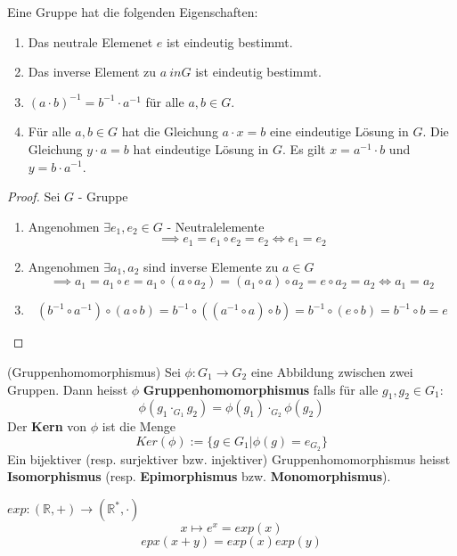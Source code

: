 \documentclass[../Algebra_script.tex]{subfiles}
\begin{document}
\begin{proposition}
	Eine Gruppe hat die folgenden Eigenschaften:
	\begin{enumerate}
		\item Das neutrale Elemenet $e$ ist eindeutig bestimmt.
		\item Das inverse Element zu $a \ in G$ ist eindeutig bestimmt.
		\item $(a \cdot b)^{-1} = b^{-1} \cdot a^{-1}$ für alle $a, b \in G$.
		\item Für alle $a, b \in G$ hat die Gleichung $a \cdot x = b$ eine eindeutige Lösung in $G$. Die Gleichung $y \cdot a = b$ hat eindeutige Lösung in $G$. Es gilt $x = a^{-1} \cdot b$ und $y = b \cdot a^{-1}$.
	 \end{enumerate}
\end{proposition}

\begin{proof}
	Sei $G$ - Gruppe
	\begin{enumerate}
		\item Angenohmen $\exists e_1, e_2 \in G$ - Neutralelemente 
			\[\implies e_1 = e_1 \circ e_2 = e_2 \iff e_1 = e_2\]
		\item Angenohmen $\exists a_1, a_2$ sind inverse Elemente zu $a \in G$
			\[\implies a_1 = a_1 \circ e = a_1 \circ (a \circ a_2) = (a_1 \circ a) \circ a_2 = e \circ a_2 = a_2 \iff a_1 = a_2\]	
		\item \[(b^{-1} \circ a^{-1}) \circ (a \circ b) = b^{-1} \circ ((a^{-1} \circ a) \circ b) = b^{-1} \circ (e \circ b) = b^{-1} \circ b = e\]
	\end{enumerate}
\end{proof}

\begin{definition}{(Gruppenhomomorphismus)}
	Sei $\phi: G_1 \to G_2$ eine Abbildung zwischen zwei Gruppen. Dann heisst $\phi$ \textbf{Gruppenhomomorphismus} falls für alle $g_1, g_2 \in G_1$:
	\[\phi(g_1 \cdot_{G_1} g_2) = \phi(g_1) \cdot_{G_2} \phi(g_2)\]
	Der \textbf{Kern} von $\phi$ ist die Menge
	\[Ker(\phi) := \{g \in G_1 | \phi(g) = e_{G_2}\}\]
	Ein bijektiver (resp. surjektiver bzw. injektiver) Gruppenhomomorphismus heisst \textbf{Isomorphismus} (resp. \textbf{Epimorphismus} bzw. \textbf{Monomorphismus}).
\end{definition}

\begin{example}{$exp: (\mathbb{R}, +) \to (\mathbb{R}^{*}, \cdot)$}
		\[x \mapsto e^x = exp(x)\]
		\[epx(x + y) = exp(x)exp(y)\]
\end{example}
\end{document}
